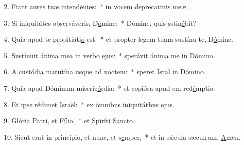 2. Fiant aures tuæ intend\uline{é}ntes:~* in vocem deprecatinis m\uline{e}æ.\par 
3. Si iniquitátes observáveris, D\uline{ó}mine:~* Dómine, quis sstin\uline{é}bit?\par 
4. Quia apud te propitiáti\uline{o} est:~* et propter legem tuam sustínu te, D\uline{ó}mine.\par 
5. Sustínuit ánima mea in verbo \uline{e}jus:~* sperávit ánima me in D\uline{ó}mino.\par 
6. A custódia matutína usque ad n\uline{o}ctem:~* speret Isral in D\uline{ó}mino.\par 
7. Quia apud Dóminum miseric\uline{ó}rdia:~* et copiósa apud em red\uline{é}mptio.\par 
8. Et ipse rédimet \uline{I}sraël:~* ex ómnibus iniquitátbus \uline{e}jus.\par 
9. Glória Patri, et F\uline{í}lio,~* et Spiríti S\uline{a}ncto.\par 
10. Sicut erat in princípio, et nunc, et s\uline{e}mper,~* et in sǽcula sæculrum. \uline{A}men.\par 
